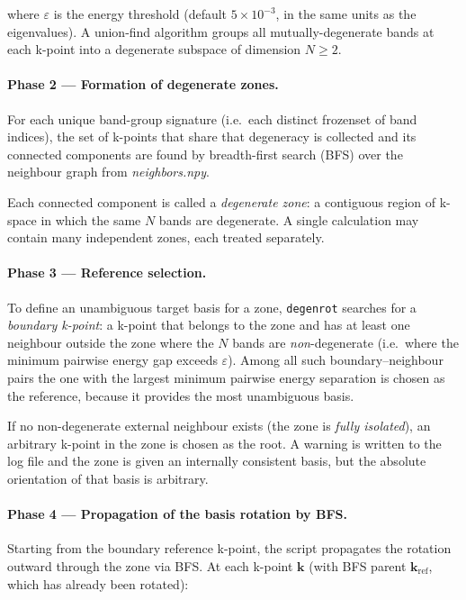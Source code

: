 \documentclass[a4paper,12pt]{report}
\begin{document}
where $\varepsilon$ is the energy threshold (default $5\times10^{-3}$, in the same
units as the eigenvalues).
A union-find algorithm \cite{Cormen2009} groups all mutually-degenerate bands at
each k-point into a degenerate subspace of dimension $N \ge 2$.


\paragraph{Phase 2 --- Formation of degenerate zones.}

For each unique band-group signature (i.e.\ each distinct frozenset of band
indices), the set of k-points that share that degeneracy is collected and its
connected components are found by breadth-first search (BFS) over the
neighbour graph from \emph{neighbors.npy}.

Each connected component is called a \emph{degenerate zone}: a contiguous
region of k-space in which the same $N$ bands are degenerate.
A single calculation may contain many independent zones, each treated
separately.


\paragraph{Phase 3 --- Reference selection.}

To define an unambiguous target basis for a zone, \texttt{degenrot} searches
for a \emph{boundary k-point}: a k-point that belongs to the zone and has at
least one neighbour outside the zone where the $N$ bands are
\emph{non}-degenerate (i.e.\ where the minimum pairwise energy gap exceeds
$\varepsilon$).
Among all such boundary–neighbour pairs the one with the largest minimum
pairwise energy separation is chosen as the reference, because it provides the
most unambiguous basis.

If no non-degenerate external neighbour exists (the zone is \emph{fully
isolated}), an arbitrary k-point in the zone is chosen as the root.
A warning is written to the log file and the zone is given an internally
consistent basis, but the absolute orientation of that basis is arbitrary.


\paragraph{Phase 4 --- Propagation of the basis rotation by BFS.}

Starting from the boundary reference k-point, the script propagates the
rotation outward through the zone via BFS.
At each k-point $\pmb{k}$ (with BFS parent $\pmb{k}_{\mathrm{ref}}$, which
has already been rotated):
\end{document}
